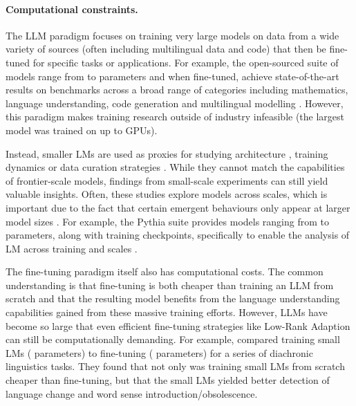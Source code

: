 \paragraph{Computational constraints.} The LLM paradigm focuses on training very large models on data from a wide variety of sources (often including multilingual data and code) that then be fine-tuned for specific tasks or applications. For example, the open-sourced \llamathree suite of models range from  to  parameters and when fine-tuned, achieve state-of-the-art results on benchmarks across a broad range of categories including mathematics, language understanding, code generation and multilingual modelling \citep{grattafiori2024llama}. However, this paradigm makes training research outside of industry infeasible (the largest \llamathree model was trained on up to  GPUs).

Instead, smaller LMs are used as proxies for studying architecture \citep{charpentier2024gpt}, training dynamics \citep{martinez2024tending} or data curation strategies \citep{huebner-etal-2021-babyberta}. While they cannot match the capabilities of frontier-scale models, findings from small-scale experiments can still yield valuable insights. Often, these studies explore models across scales, which is important due to the fact that certain emergent behaviours only appear at larger model sizes \citep{wei2022emergent, ganguli2022predictability}. For example, the Pythia suite provides models ranging from  to  parameters, along with training checkpoints, specifically to enable the analysis of LM across training and scales \citep{biderman2023pythia}.

The fine-tuning paradigm itself also has computational costs. The common understanding is that fine-tuning is both cheaper than training an LLM from scratch and that the resulting model benefits from the language understanding capabilities gained from these massive training efforts. However, LLMs have become so large that even efficient fine-tuning strategies like Low-Rank Adaption \citep[LoRA;][]{hu2022lora} can still be computationally demanding. For example, \citet{fittschen2025pretraininglanguagemodelsdiachronic} compared training small LMs ( parameters) to fine-tuning \llamathree ( parameters) for a series of diachronic linguistics tasks. They found that not only was training small LMs from scratch cheaper than fine-tuning, but that the small LMs yielded better detection of language change and word sense introduction/obsolescence. 


